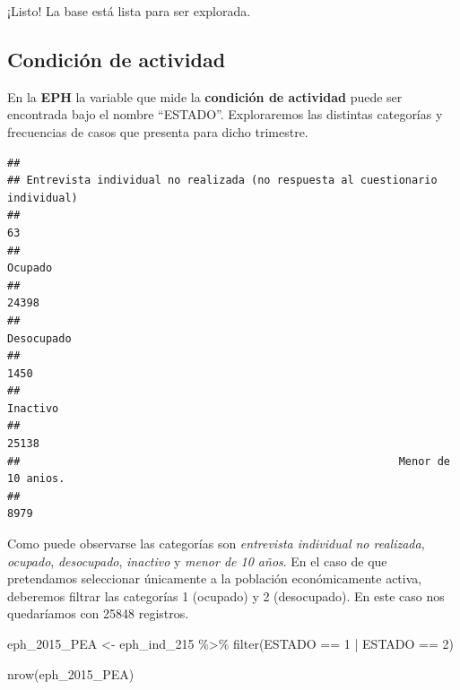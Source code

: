 \documentclass[
]{book}
\newenvironment{Shaded}{\begin{snugshade}}{\end{snugshade}}
\newcommand{\DecValTok}[1]{\textcolor[rgb]{0.00,0.00,0.81}{#1}}
\newcommand{\FunctionTok}[1]{\textcolor[rgb]{0.00,0.00,0.00}{#1}}
\newcommand{\NormalTok}[1]{#1}
\newcommand{\OtherTok}[1]{\textcolor[rgb]{0.56,0.35,0.01}{#1}}
\newcommand{\SpecialCharTok}[1]{\textcolor[rgb]{0.00,0.00,0.00}{#1}}
\begin{document}
¡Listo! La base está lista para ser explorada.

\hypertarget{condiciuxf3n-de-actividad-1}{%
\subsection{Condición de actividad}\label{condiciuxf3n-de-actividad-1}}

En la \textbf{EPH} la variable que mide la \textbf{condición de actividad} puede ser encontrada bajo el nombre ``ESTADO''. Exploraremos las distintas categorías y frecuencias de casos que presenta para dicho trimestre.

\begin{Shaded}
\end{Shaded}

\begin{verbatim}
## 
## Entrevista individual no realizada (no respuesta al cuestionario individual) 
##                                                                           63 
##                                                                      Ocupado 
##                                                                        24398 
##                                                                   Desocupado 
##                                                                         1450 
##                                                                     Inactivo 
##                                                                        25138 
##                                                           Menor de 10 anios. 
##                                                                         8979
\end{verbatim}

Como puede observarse las categorías son \emph{entrevista individual no realizada}, \emph{ocupado}, \emph{desocupado}, \emph{inactivo} y \emph{menor de 10 años}. En el caso de que pretendamos seleccionar únicamente a la población económicamente activa, deberemos filtrar las categorías 1 (ocupado) y 2 (desocupado). En este caso nos quedaríamos con 25848 registros.

\begin{Shaded}
\begin{Highlighting}[]
\NormalTok{eph\_2015\_PEA }\OtherTok{\textless{}{-}}\NormalTok{ eph\_ind\_215 }\SpecialCharTok{\%\textgreater{}\%} 
    \FunctionTok{filter}\NormalTok{(ESTADO }\SpecialCharTok{==} \DecValTok{1} \SpecialCharTok{|}\NormalTok{ ESTADO }\SpecialCharTok{==} \DecValTok{2}\NormalTok{)}

\FunctionTok{nrow}\NormalTok{(eph\_2015\_PEA)}
\end{Highlighting}
\end{Shaded}
\end{document}
